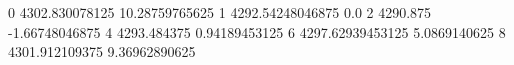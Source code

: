 0 4302.830078125 10.28759765625
1 4292.54248046875 0.0
2 4290.875 -1.66748046875
4 4293.484375 0.94189453125
6 4297.62939453125 5.0869140625
8 4301.912109375 9.36962890625
